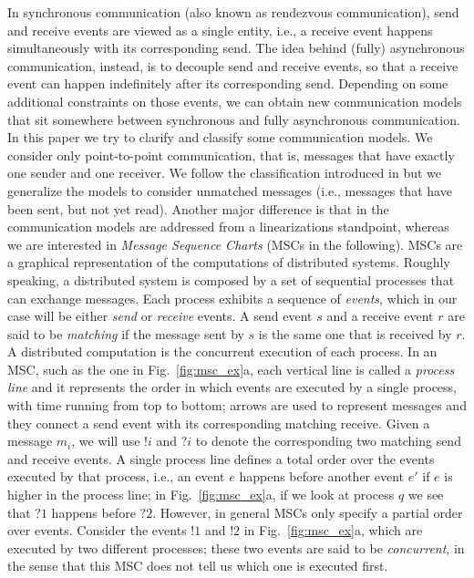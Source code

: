 


In synchronous communication (also known as rendezvous communication), send and receive events are  viewed as a single entity, i.e., a receive event  happens simultaneously with its corresponding send. The  idea behind (fully) asynchronous communication, instead, is to decouple send and receive events, so that a receive event can happen indefinitely after its corresponding send. Depending on some additional constraints on those events, we can obtain new communication models that sit somewhere between synchronous and fully asynchronous communication.
In this paper we try to clarify and classify some communication models.  We consider only point-to-point communication, that is, messages that have exactly one sender and one receiver.  We follow the classification introduced in \cite{DBLP:journals/fac/ChevrouHQ16} but we generalize the models to  consider unmatched messages (i.e., messages that have been sent, but not yet read). Another major difference is that in \cite{DBLP:journals/fac/ChevrouHQ16} the communication models are addressed from a linearizations standpoint, whereas we are interested in \emph{Message Sequence Charts} (MSCs in the following). 
MSCs  are a graphical representation of the  computations of distributed systems.  Roughly speaking, a distributed system is composed by a set of sequential processes that can exchange messages. Each process exhibits a sequence of \emph{events}, which in our case will be either \emph{send} or \emph{receive} events. A send event $s$ and a receive event $r$ are said to be \emph{matching} if the message sent by $s$ is the same one that is received by $r$. A distributed computation is the concurrent execution of each process. In an MSC, such as the one in Fig.~\ref{fig:msc_ex}a, each vertical line is called a \emph{process line} and it represents the order in which events are executed by a single process, with time running from top to bottom; arrows are used to represent messages and they connect a send event with its corresponding matching receive. 
Given a message $m_i$, we will use $!i$ and $?i$ to denote the corresponding two matching send and receive events. A single process line defines a total order over the events executed by that process, i.e., an event $e$ happens before another event $e'$ if $e$ is higher in the process line; in Fig.~\ref{fig:msc_ex}a, if we look at process $q$ we see that $?1$ happens before $?2$. However, in general MSCs only specify a partial order over events. Consider the events $!1$ and $!2$ in Fig.~\ref{fig:msc_ex}a, which are executed by two different processes; these two events are said to be \emph{concurrent}, in the sense that this MSC does not tell us which one is executed first. 
